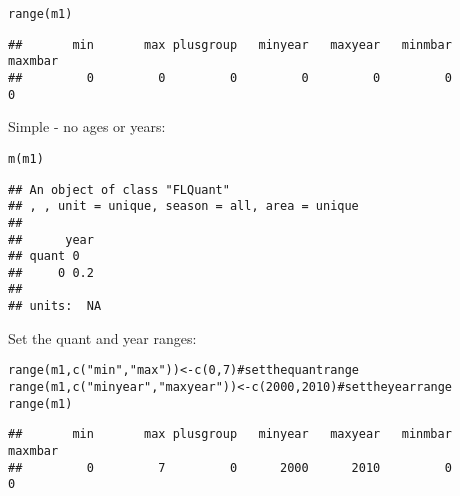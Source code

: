 \documentclass[a4paper,english,10pt]{article}\usepackage[]{graphicx}\usepackage[]{color}
\makeatletter
\newcommand{\hlnum}[1]{\textcolor[rgb]{0.063,0.58,0.627}{#1}}%
\newcommand{\hlstr}[1]{\textcolor[rgb]{0.063,0.58,0.627}{#1}}%
\newcommand{\hlcom}[1]{\textcolor[rgb]{0.588,0.588,0.588}{#1}}%
\newcommand{\hlstd}[1]{\textcolor[rgb]{0.196,0.196,0.196}{#1}}%
\newcommand{\hlkwb}[1]{\textcolor[rgb]{0.627,0,0.314}{#1}}%
\newcommand{\hlkwd}[1]{\textcolor[rgb]{0.78,0.227,0.412}{#1}}%
\newenvironment{kframe}{%
 \def\at@end@of@kframe{}%
 \ifinner\ifhmode%
  \def\at@end@of@kframe{\end{minipage}}%
  \begin{minipage}{\columnwidth}%
 \fi\fi%
 \def\FrameCommand##1{\hskip\@totalleftmargin \hskip-\fboxsep
 \colorbox{shadecolor}{##1}\hskip-\fboxsep
     \hskip-\linewidth \hskip-\@totalleftmargin \hskip\columnwidth}%
 \MakeFramed {\advance\hsize-\width
   \@totalleftmargin\z@ \linewidth\hsize
   \@setminipage}}%
 {\par\unskip\endMakeFramed%
 \at@end@of@kframe}
\newenvironment{knitrout}{}{} %
\makeatother
\begin{document}
\begin{knitrout}
\color{fgcolor}\begin{kframe}
\begin{alltt}
\hlkwd{range}\hlstd{(m1)}
\end{alltt}
\begin{verbatim}
##       min       max plusgroup   minyear   maxyear   minmbar   maxmbar 
##         0         0         0         0         0         0         0
\end{verbatim}
\end{kframe}
\end{knitrout}

Simple - no ages or years:

\begin{knitrout}
\color{fgcolor}\begin{kframe}
\begin{alltt}
\hlkwd{m}\hlstd{(m1)}
\end{alltt}
\begin{verbatim}
## An object of class "FLQuant"
## , , unit = unique, season = all, area = unique
## 
##      year
## quant 0  
##     0 0.2
## 
## units:  NA
\end{verbatim}
\end{kframe}
\end{knitrout}

Set the quant and year ranges:

\begin{knitrout}
\color{fgcolor}\begin{kframe}
\begin{alltt}
\hlkwd{range}\hlstd{(m1,} \hlkwd{c}\hlstd{(}\hlstr{"min"}\hlstd{,} \hlstr{"max"}\hlstd{))} \hlkwb{<-} \hlkwd{c}\hlstd{(}\hlnum{0}\hlstd{,} \hlnum{7}\hlstd{)}  \hlcom{# set the quant range}
\hlkwd{range}\hlstd{(m1,} \hlkwd{c}\hlstd{(}\hlstr{"minyear"}\hlstd{,} \hlstr{"maxyear"}\hlstd{))} \hlkwb{<-} \hlkwd{c}\hlstd{(}\hlnum{2000}\hlstd{,} \hlnum{2010}\hlstd{)}  \hlcom{# set the year range}
\hlkwd{range}\hlstd{(m1)}
\end{alltt}
\begin{verbatim}
##       min       max plusgroup   minyear   maxyear   minmbar   maxmbar 
##         0         7         0      2000      2010         0         0
\end{verbatim}
\end{kframe}
\end{knitrout}
\end{document}
